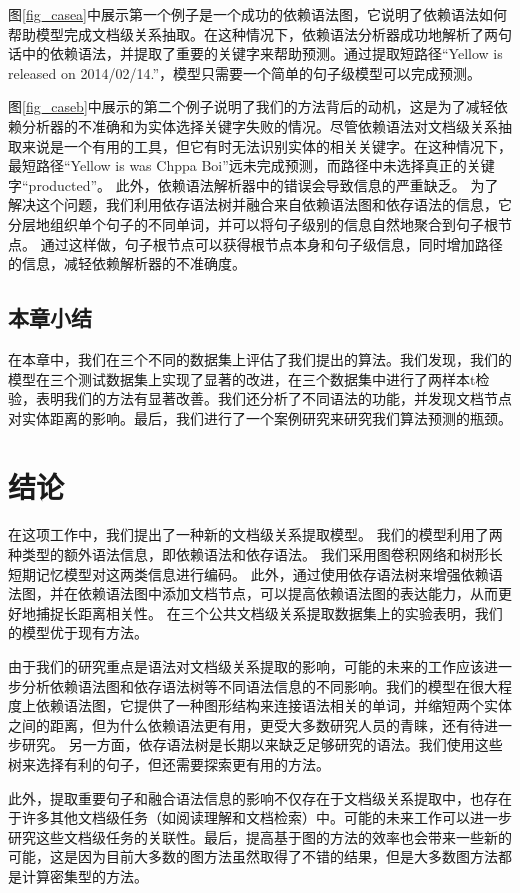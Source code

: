 \documentclass[bachelor]{thesis-uestc}
\begin{document}
图\ref{fig_casea}中展示第一个例子是一个成功的依赖语法图，它说明了依赖语法如何帮助模型完成文档级关系抽取。在这种情况下，依赖语法分析器成功地解析了两句话中的依赖语法，并提取了重要的关键字来帮助预测。通过提取短路径“Yellow is released on 2014/02/14.”，模型只需要一个简单的句子级模型可以完成预测。

图\ref{fig_caseb}中展示的第二个例子说明了我们的方法背后的动机，这是为了减轻依赖分析器的不准确和为实体选择关键字失败的情况。尽管依赖语法对文档级关系抽取来说是一个有用的工具，但它有时无法识别实体的相关关键字。在这种情况下，最短路径“Yellow is was Chppa Boi”远未完成预测，而路径中未选择真正的关键字“producted”。
此外，依赖语法解析器中的错误会导致信息的严重缺乏。
为了解决这个问题，我们利用依存语法树并融合来自依赖语法图和依存语法的信息，它分层地组织单个句子的不同单词，并可以将句子级别的信息自然地聚合到句子根节点。
通过这样做，句子根节点可以获得根节点本身和句子级信息，同时增加路径的信息，减轻依赖解析器的不准确度。\par

\section{本章小结}\label{sec:conclusion}

在本章中，我们在三个不同的数据集上评估了我们提出的算法。我们发现，我们的模型在三个测试数据集上实现了显著的改进，在三个数据集中进行了两样本t检验，表明我们的方法有显著改善。我们还分析了不同语法的功能，并发现文档节点对实体距离的影响。最后，我们进行了一个案例研究来研究我们算法预测的瓶颈。\par
\chapter{结论}
在这项工作中，我们提出了一种新的文档级关系提取模型。
我们的模型利用了两种类型的额外语法信息，即依赖语法和依存语法。
我们采用图卷积网络和树形长短期记忆模型对这两类信息进行编码。
此外，通过使用依存语法树来增强依赖语法图，并在依赖语法图中添加文档节点，可以提高依赖语法图的表达能力，从而更好地捕捉长距离相关性。
在三个公共文档级关系提取数据集上的实验表明，我们的模型优于现有方法。\par

由于我们的研究重点是语法对文档级关系提取的影响，可能的未来的工作应该进一步分析依赖语法图和依存语法树等不同语法信息的不同影响。我们的模型在很大程度上依赖语法图，它提供了一种图形结构来连接语法相关的单词，并缩短两个实体之间的距离，但为什么依赖语法更有用，更受大多数研究人员的青睐，还有待进一步研究。
另一方面，依存语法树是长期以来缺乏足够研究的语法。我们使用这些树来选择有利的句子，但还需要探索更有用的方法。\par
此外，提取重要句子和融合语法信息的影响不仅存在于文档级关系提取中，也存在于许多其他文档级任务（如阅读理解和文档检索）中。可能的未来工作可以进一步研究这些文档级任务的关联性。最后，提高基于图的方法的效率也会带来一些新的可能，这是因为目前大多数的图方法虽然取得了不错的结果，但是大多数图方法都是计算密集型的方法。\par
\end{document}
